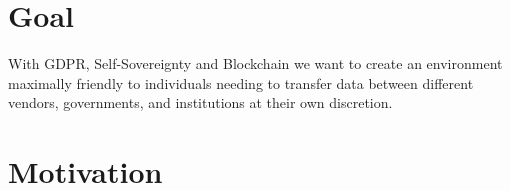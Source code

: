 \section{Goal}
With GDPR, Self-Sovereignty and Blockchain we want to create an environment maximally friendly to individuals needing to transfer data between different vendors, governments, and institutions at their own discretion.	
	




\section{Motivation}
